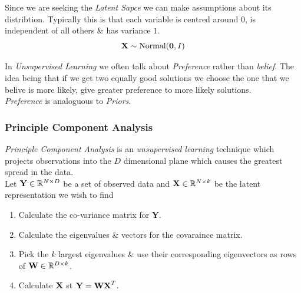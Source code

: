 \documentclass[11pt,a4paper]{article}
\begin{document}
Since we are seeking the \textit{Latent Sapce} we can make assumptions about its distribtion. Typically this is that each variable is centred around 0, is independent of all others \& has variance $1$.
$$\textbf{X}\sim\text{Normal}(\textbf{0},I)$$

In \textit{Unsupervised Learning} we often talk about \textit{Preference} rather than \textit{belief}. The idea being that if we get two equally good solutions we choose the one that we belive is more likely, \ie give greater preference to more likely solutions.\\
\nb \textit{Preference} is analoguous to \textit{Priors}.

\subsubsection{Principle Component Analysis}

\textit{Principle Component Analysis} is an \textit{unsupervised learning} technique which projects observations into the $D$ dimensional plane which causes the greatest spread in the data.\\
Let $\textbf{Y}\in\mathbb{R}^{N\times D}$ be a set of observed data and $\textbf{X}\in\mathbb{R}^{N\times k}$ be the latent representation we wish to find
\begin{enumerate}
	\item Calculate the co-variance matrix for \textbf{Y}.
	\item Calculate the eigenvalues \& vectors for the covaraince matrix.
	\item Pick the $k$ largest eigenvalues \& use their corresponding eigenvectors as rows of $\textbf{W}\in\mathbb{R}^{D\times k}$.
	\item Calculate $\textbf{X}$ st $\textbf{Y}=\textbf{W}\textbf{X}^T$.
\end{enumerate}
\end{document}
